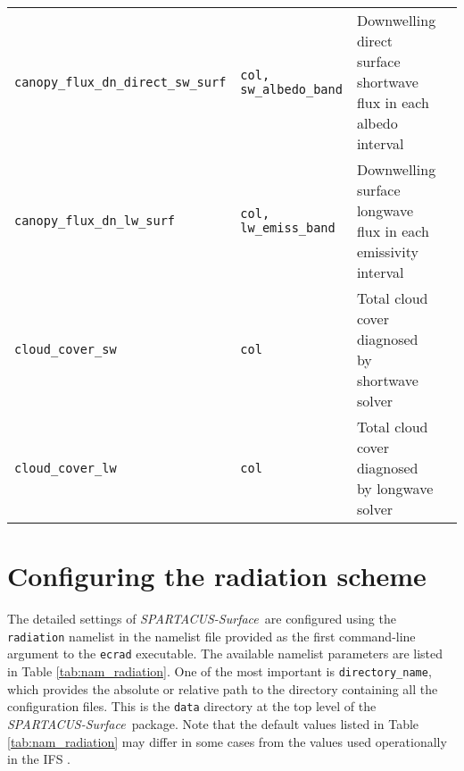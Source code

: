 \documentclass[a4,oneside]{article}
\def\codesize{\small}
\def\codetabsize{\footnotesize}
\def\spsurf{\emph{SPARTACUS-Surface}}
\def\code#1{{\codesize\texttt{#1}}}
\def\codetab#1{{\codetabsize\texttt{#1}}}
\begin{document}
\begin{center}
\begin{longtable}{llLp{5.9cm}}
\codetab{canopy\_flux\_dn\_direct\_sw\_surf} & \codetab{col, sw\_albedo\_band} & Downwelling direct surface shortwave flux in each albedo interval \\
\codetab{canopy\_flux\_dn\_lw\_surf} & \codetab{col, lw\_emiss\_band} & Downwelling surface longwave flux in each emissivity interval \\
\codetab{cloud\_cover\_sw} & \codetab{col} & Total cloud cover diagnosed by shortwave solver\\
\codetab{cloud\_cover\_lw} & \codetab{col} & Total cloud cover diagnosed by longwave solver\\
\hline
\end{longtable}
\end{center}


\section{Configuring the radiation scheme}
\label{sec:nam_radiation}
The detailed settings of \spsurf\ are configured using the
\code{radiation} namelist in the namelist file provided as the first
command-line argument to the \code{ecrad} executable. The available
namelist parameters are listed in Table \ref{tab:nam_radiation}. One of
the most important is \code{directory\_name}, which provides the
absolute or relative path to the directory containing all the
configuration files. This is the \code{data} directory at the top
level of the \spsurf\ package. Note that the default values listed in
Table \ref{tab:nam_radiation} may differ in some cases from the values
used operationally in the IFS \cite[see Table 2 of][]{Hogan+2018}.

\end{document}
